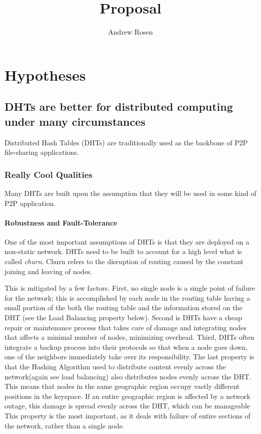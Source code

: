 \documentclass[10pt,letterpaper]{report}
\title{Proposal}
\author{Andrew Rosen}
\begin{document}
\maketitle
\setcounter{tocdepth}{4}
\tableofcontents
\newpage
\chapter{Hypotheses}

\section{DHTs are better for distributed computing under many circumstances}
Distributed Hash Tables (DHTs) are traditionally used as the backbone of P2P file-sharing applications.


\subsection{Really Cool Qualities}
Many DHTs are built upon the assumption that they will be used in some kind of P2P application.  
\subsubsection{Robustness and Fault-Tolerance}
One of the most important assumptions of DHTs is that they are deployed on a non-static network.
DHTs need to be built to account for a high level what is called \textit{churn}.  
Churn refers to the disruption of routing caused by the constant joining and leaving of nodes.

This is mitigated by a few factors.  
First, no single node is a single point of failure for the network;  this is accomplished by each node in the routing table having a small portion of the both the routing table and the information stored on the DHT (see the Load Balancing property below).  
Second is DHTs have a cheap repair or maintenance process that takes care of damage and integrating nodes that affects a minimal number of nodes, minimizing overhead. 
Third, DHTs often integrate a backup process into their protocols so that when a node goes down, one of the neighbors immediately take over its responsibility.
The last property is that the Hashing Algorithm used to distribute content evenly across the network(again see load balancing) also distributes nodes evenly across the DHT.  
This means that nodes in the same geographic region occupy vastly different positions in the keyspace.  
If an entire geographic region is affected by a network outage, this damage is spread evenly across the DHT, which can be manageable
This property is the most important, as it deals with failure of entire sections of the network, rather than a single node.
\end{document}
